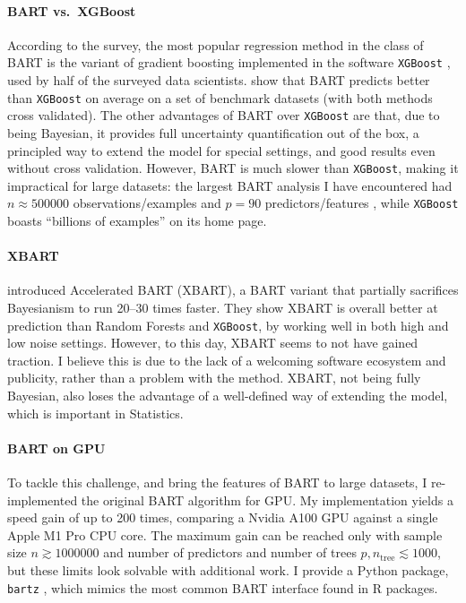 \documentclass{article}
\begin{document}
    \paragraph{BART vs.\ XGBoost}

    According to the \textcite[p.~35]{kaggle2021} survey, the most popular regression method in the class of BART is the variant of gradient boosting implemented in the software \texttt{XGBoost} \autocite{chen2016}, used by half of the surveyed data scientists. \textcite[table~2, p.~1105]{linero2018b} show that BART predicts better than \texttt{XGBoost} on average on a set of benchmark datasets (with both methods cross validated). The other advantages of BART over \texttt{XGBoost} are that, due to being Bayesian, it provides full uncertainty quantification out of the box, a principled way to extend the model for special settings, and good results even without cross validation. However, BART is much slower than \texttt{XGBoost}, making it impractical for large datasets: the largest BART analysis I have encountered had $n\approx\num{500000}$ observations/examples and $p=90$ predictors/features \autocite{pratola2020}, while \texttt{XGBoost} boasts ``billions of examples'' on its home page.

    \paragraph{XBART}

    \textcite{he2019,he2021} introduced Accelerated BART (XBART), a BART variant that partially sacrifices Bayesianism to run 20--30 times faster. They show XBART is overall better at prediction than Random Forests and \texttt{XGBoost}, by working well in both high and low noise settings. However, to this day, XBART seems to not have gained traction. I believe this is due to the lack of a welcoming software ecosystem and publicity, rather than a problem with the method. XBART, not being fully Bayesian, also loses the advantage of a well-defined way of extending the model, which is important in Statistics.

    \paragraph{BART on GPU}

    To tackle this challenge, and bring the features of BART to large datasets, I re-implemented the original BART algorithm for GPU. My implementation yields a speed gain of up to 200 times, comparing a Nvidia A100 GPU against a single Apple M1 Pro CPU core. The maximum gain can be reached only with sample size $n \gtrsim \num{1000000}$ and  number of predictors and number of trees $p,n_\text{tree}\lesssim 1000$, but these limits look solvable with additional work. I provide a Python package, \texttt{bartz} \autocite{petrillo2024b}, which mimics the most common BART interface found in R packages.
\end{document}
